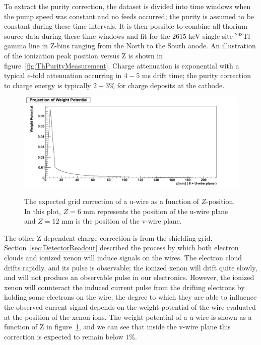 To extract the purity correction, the dataset is divided into time windows when the pump speed was constant and no feeds occurred; the purity is assumed to be constant during these time intervals.  It is then possible to combine all thorium source data during these time windows and fit for the $2615$-keV single-site $^{208}$Tl gamma line in Z-bins ranging from the North to the South anode.  An illustration of the ionization peak position versus Z is shown in figure~\ref{fig:ThPurityMeasurement}.  Charge attenuation is exponential with a typical $e$-fold attenuation occurring in $4-5$ ms drift time; the purity correction to charge energy is typically $2-3\%$ for charge deposits at the cathode.~\cite{EnergyDocumentRun2ab}

\begin{figure}
\begin{center}
\includegraphics[keepaspectratio=true,width=\textwidth]{GridCorrectionVsZ.png}
\end{center}
\renewcommand{\baselinestretch}{1}
\small\normalsize
\begin{quote}
\caption{The expected grid correction of a u-wire as a function of $Z$-position.  In this plot, $Z = 6$ mm represents the position of the u-wire plane and $Z = 12$ mm is the position of the v-wire plane.~\cite{EnergyDocumentRun2a}}
\label{fig:GridCorrectionVsZ}
\end{quote}
\end{figure}
\renewcommand{\baselinestretch}{2}
\small\normalsize

The other Z-dependent charge correction is from the shielding grid.  Section~\ref{sec:DetectorReadout} described the process by which both electron clouds and ionized xenon will induce signals on the wires.  The electron cloud drifts rapidly, and its pulse is observable; the ionized xenon will drift quite slowly, and will not produce an observable pulse in our electronics.  However, the ionized xenon will counteract the induced current pulse from the drifting electrons by holding some electrons on the wire; the degree to which they are able to influence the observed current signal depends on the weight potential of the wire evaluated at the position of the xenon ions.  The weight potential of a u-wire is shown as a function of Z in figure~\ref{fig:GridCorrectionVsZ}, and we can see that inside the v-wire plane this correction is expected to remain below $1\%$.~\cite{EnergyDocumentRun2a}

